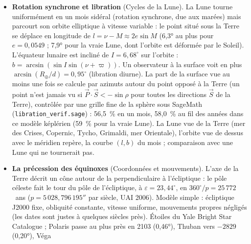 \begin{itemize}
\emph{Meteoritics \& Planetary Science} 40, 817) : cavité transitoire
$D_{tc}=1{,}161\,(\rho_i/\rho_t)^{1/3}L^{0{,}78}v^{0{,}44}g^{-0{,}22}\sin^{1/3}\theta$, profondeur $D_{tc}/2\sqrt2$ ;
cratère simple ($D=1{,}25\,D_{tc}$, lentille de brèche) ou complexe ($D=1{,}17\,D_{tc}^{1{,}13}/D_c^{0{,}13}$,
$D_c=3{,}2$~km, profondeur $0{,}4\,D^{0{,}3}$) ; énergie $\tfrac12mv^2$ en mégatonnes ($4{,}18\times10^{15}$~J), un impact
aussi énergique tous les $109\,E_\text{Mt}^{0{,}78}$~ans. Le cas du cours (1,5~km à 20~km\,s$^{-1}$) donne 22,4~km.
Coupe à l'échelle animée (chute, creusement, effondrement) et diamètre final selon la taille de l'impacteur.
L'entrée atmosphérique n'est pas modélisée (impacteurs de plus de 200~m).
\item \textbf{Rotation synchrone et libration} (Cycles de la Lune). La Lune tourne uniformément en un mois sidéral
(rotation synchrone, due aux marées) mais parcourt son orbite elliptique à vitesse variable : le point situé sous la
Terre se déplace en longitude de $l=\nu-M\approx2e\sin M$ (6,3° au plus pour $e=0{,}0549$ ; 7,9° pour la vraie Lune,
dont l'orbite est déformée par le Soleil). L'équateur lunaire est incliné de $I=6{,}68^\circ$ sur l'orbite :
$b=\arcsin(\sin I\sin(\nu+\varpi))$. Un observateur à la surface voit en plus $\arcsin(R_\oplus/d)=0{,}95^\circ$
(libration diurne). La part de la surface vue au moins une fois se calcule par azimuts autour du point opposé à la
Terre (un point n'est jamais vu si $\vec P\cdot\vec S<-\sin\rho$ pour toutes les directions $\vec S$ de la Terre),
contrôlée par une grille fine de la sphère sous SageMath (\texttt{libration\_verif.sage}) : 56,5~\% en un mois, 58,0~\%
au fil des années dans ce modèle képlérien (59~\% pour la vraie Lune). La Lune vue de la Terre (mer des Crises,
Copernic, Tycho, Grimaldi, mer Orientale), l'orbite vue de dessus avec le méridien repère, la courbe $(l,b)$ du mois ;
comparaison avec une Lune qui ne tournerait pas.
\item \textbf{La précession des équinoxes} (Coordonnées et mouvements). L'axe de la Terre décrit un cône autour de la
perpendiculaire à l'écliptique : le pôle céleste fait le tour du pôle de l'écliptique, à $\varepsilon=23{,}44^\circ$, en
$360^\circ/p=25\,772$~ans ($p=5\,028{,}796\,195''$ par siècle, UAI 2006). Modèle simple : écliptique J2000 fixe,
obliquité constante, vitesse uniforme, mouvements propres négligés (les dates sont justes à quelques siècles près).
Étoiles du Yale Bright Star Catalogue ; Polaris passe au plus près en 2103 (0,46°), Thuban vers $-2829$ (0,20°), Véga

\end{itemize}
